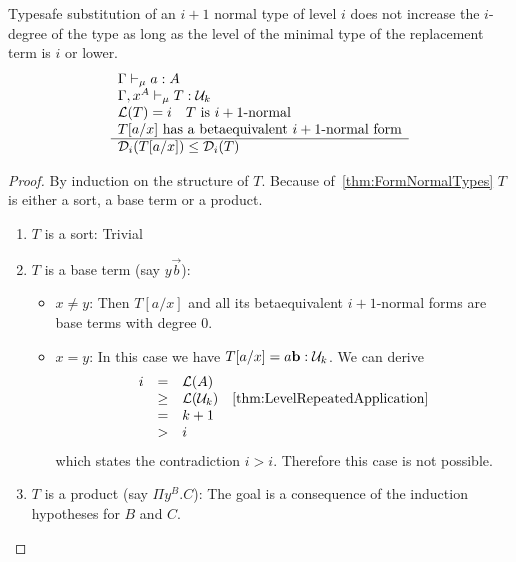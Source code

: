 \begin{theorem}
    Typesafe substitution of an $i+1$ normal type of level $i$ does not increase
    the $i$-degree of the type as long as the level of the minimal type of the
    replacement term is $i$ or lower.
    \label{thm:DegreeTypesafeSubstitution}
    $$
    \begin{array}{l} 
        \Gamma \vdash_\mu a : A
        \\
        \Gamma,x^A \vdash_\mu T: {\cal U}_k
        \\
        {\cal L}(T) = i   \quad \text{$T$ is $i+1$-normal}
        \\
        \text{$T[a/x]$ has a betaequivalent $i+1$-normal form}
     \\ \hline 
        {\cal D}_i(T[a/x]) \le {\cal D}_i(T)
    \end{array}
    $$
    \begin{proof}
        By induction on the structure of $T$. Because of~\ref{thm:FormNormalTypes}
        $T$ is either a
        sort, a base term or a product.
        \begin{enumerate}
            \item $T$ is a sort: Trivial

            \item $T$ is a base term (say $y \vec b$):
                \begin{itemize}
                    \item $x \ne y$: Then $T[a/x]$ and all its betaequivalent
                        $i+1$-normal forms are base terms with degree 0.

                    \item $x = y$: In this case we have $T[a/x] = a {\mathbf b} :
                        {\cal U}_k$. We can derive
                        $$
                        \begin{array}{llll}
                            i &=& {\cal L}(A)
                            \\
                            &\ge& {\cal L}({\cal U}_k)
                            &\text{\ref{thm:LevelRepeatedApplication}}
                            \\
                            &=& k + 1
                            \\
                            &>& i
                        \end{array}
                        $$
                        which states the contradiction $i > i$. Therefore this
                        case is not possible.
                \end{itemize}

            \item $T$ is a product (say $\Pi y^B. C$): The goal is a consequence
                of the induction hypotheses for $B$ and $C$.
        \end{enumerate}
    \end{proof}
\end{theorem}




